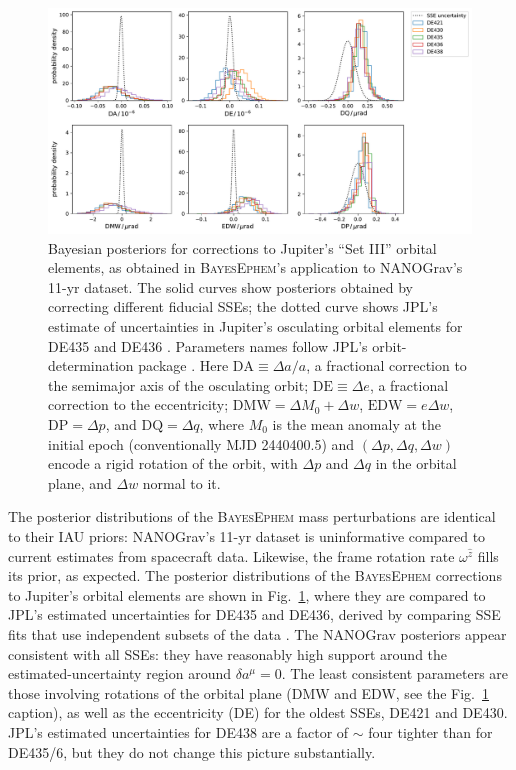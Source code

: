 \documentclass[iop,apj,twocolappendix]{emulateapj}
\begin{document}
\begin{figure}[t]
    \includegraphics[width=2\columnwidth]{figures/setIII-posteriors.pdf}
    \caption{Bayesian posteriors for corrections to Jupiter's ``Set III'' orbital elements, as obtained in \textsc{BayesEphem}'s application to NANOGrav's 11-yr dataset. The solid curves show posteriors obtained by correcting different fiducial SSEs; the dotted curve shows JPL's estimate of uncertainties in Jupiter's osculating orbital elements for DE435 and DE436 \citep{de434}.
    Parameters names follow JPL's orbit-determination package \citep{moyer2003}. %
    Here $\mathrm{DA} \equiv \Delta a/a$, a fractional correction to the semimajor axis of the osculating orbit; $\mathrm{DE} \equiv \Delta e$, a fractional correction to the eccentricity; $\mathrm{DMW} = \Delta M_0 + \Delta w$, $\mathrm{EDW} = e \Delta w$, $\mathrm{DP} = \Delta p$, and $\mathrm{DQ} = \Delta q$, where $M_0$ is the mean anomaly at the initial epoch (conventionally MJD 2440400.5) and $(\Delta p, \Delta q, \Delta w)$ encode a rigid rotation of the orbit, with $\Delta p$ and $\Delta q$ in the orbital plane, and $\Delta w$ normal to it.}
    \label{fig:setIIIposteriors}
\end{figure}

The posterior distributions of the \textsc{BayesEphem} mass perturbations are identical to their IAU priors:  NANOGrav's 11-yr dataset is uninformative compared to current estimates from spacecraft data. Likewise, the frame rotation rate $\omega^{\hat{z}}$ fills its prior, as expected.
The posterior distributions of the \textsc{BayesEphem} corrections to Jupiter's orbital elements are shown in Fig.\ \ref{fig:setIIIposteriors}, where they are compared to JPL's estimated uncertainties for DE435 and DE436, derived by comparing SSE fits that use independent subsets of the data \citep{de434}. The NANOGrav posteriors appear consistent with all SSEs: they have reasonably high support around the estimated-uncertainty region around $\delta a^\mu = 0$. The least consistent parameters are those involving rotations of the orbital plane (DMW and EDW, see the Fig.\ \ref{fig:setIIIposteriors} caption), as well as the eccentricity (DE) for the oldest SSEs, DE421 and DE430. JPL's estimated uncertainties for DE438 are a factor of $\sim$ four tighter than for DE435/6, but they do not change this picture substantially.
\end{document}
